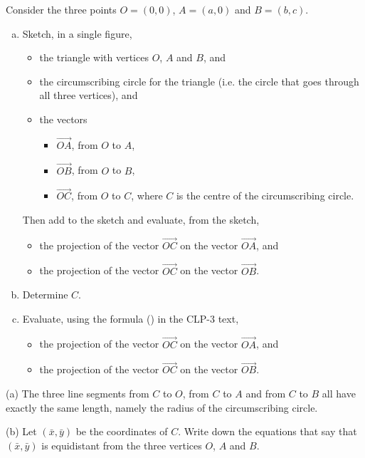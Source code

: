 \begin{question}
Consider the three points $O=(0,0)$, $A=(a,0)$ and $B=(b,c)$.
\begin{enumerate}[(a)]
\item
Sketch, in a single figure,
\begin{itemize}\itemsep1pt \parskip0pt  %
\item
the triangle with vertices $O$, $A$ and $B$, and
\item
the circumscribing circle for the triangle (i.e. the circle that goes 
through all three vertices), and
\item
the vectors
\begin{itemize}\itemsep1pt \parskip0pt  %
\item 
$\overrightarrow{OA}$, from $O$ to $A$,
\item 
$\overrightarrow{OB}$, from $O$ to $B$,
\item 
$\overrightarrow{OC}$, from $O$ to $C$, where $C$ is the centre of the circumscribing circle.
\end{itemize}
\end{itemize}
Then add to the sketch and evaluate, from the sketch,
\begin{itemize}\itemsep1pt \parskip0pt  %
\item 
the projection of the vector $\overrightarrow{OC}$ on the vector 
$\overrightarrow{OA}$, and
\item 
the projection of the vector $\overrightarrow{OC}$ on the vector 
$\overrightarrow{OB}$.
\end{itemize}

\item Determine $C$.

\item
Evaluate, using the formula () in the CLP-3 text,
\begin{itemize}\itemsep1pt \parskip0pt  %
\item 
the projection of the vector $\overrightarrow{OC}$ on the vector 
$\overrightarrow{OA}$, and
\item 
the projection of the vector $\overrightarrow{OC}$ on the vector 
$\overrightarrow{OB}$.
\end{itemize}
\end{enumerate}
\end{question}

\begin{hint}
(a)
The three line segments from $C$ to $O$, from $C$ to $A$ and from $C$ to $B$
all have exactly the same length, namely the radius of the circumscribing 
circle.

(b) 
Let $(\bar x,\bar y)$ be the coordinates of $C$.
Write down the equations that say that $(\bar x,\bar y)$ is
equidistant from the three vertices $O$, $A$ and $B$.
\end{hint}

